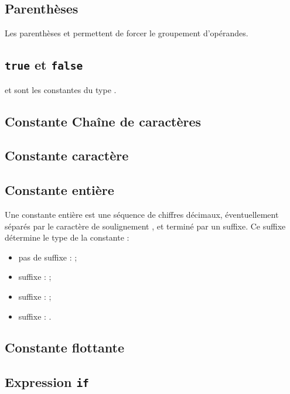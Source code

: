 \subsection{Parenthèses}

Les parenthèses \galgas{(} et \galgas{)} permettent de forcer le groupement d'opérandes.






\subsection{\texttt{true} et \texttt{false}}

 et  sont les constantes du type .

\subsection{Constante Chaîne de caractères}

\subsection{Constante caractère}

\subsection{Constante entière}

Une constante entière est une séquence de chiffres décimaux, éventuellement séparés par le caractère de soulignement \galgas{_}, et terminé par un suffixe. Ce suffixe détermine le type de la constante :
\begin{itemize}
  \item pas de suffixe :  ;
  \item suffixe  :  ;
  \item suffixe  :  ;
  \item suffixe  : .
\end{itemize}

\subsection{Constante flottante}

\subsection{Expression \texttt{if}}

